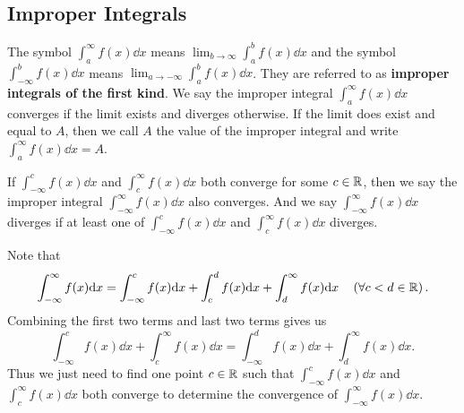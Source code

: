 \documentclass[a4paper]{ctexart}
\begin{document}
    \subsection{Improper Integrals}
    \begin{mydef}
        The symbol $\displaystyle \int_a^\infty f(x) \dd x$ means $\displaystyle \lim_{b\to \infty} \int_a^b f(x) \dd x$ and the symbol $\displaystyle \int_{-\infty}^b f(x) \dd x$ means $\displaystyle \lim_{a\to -\infty} \int_a^b f(x) \dd x$. They are referred to as \textbf{improper integrals of the first kind}. We say the improper integral $\displaystyle \int_a^\infty f(x) \dd x$ converges if the limit exists and diverges otherwise. If the limit does exist and equal to $A$, then we call $A$ the value of the improper integral and write $\displaystyle \int_a^\infty f(x) \dd x=A$.

        If $\displaystyle \int_{-\infty}^c f(x) \dd x$ and $\displaystyle \int_c^\infty f(x) \dd x$ both converge for some $c\in \mathbb{R}$, then we say the improper integral $\displaystyle \int_{-\infty}^\infty f(x) \dd x$ also converges. And we say $\displaystyle \int_{-\infty}^\infty f(x) \dd x$ diverges if at least one of $\displaystyle \int_{-\infty}^c f(x) \dd x$ and $\displaystyle \int_c^\infty f(x) \dd x$ diverges.
    \end{mydef}
    \begin{myrmk}
        Note that
        \[
        \int_{-\infty}^\infty f(x) \dd x = \int_{-\infty}^c f(x) \dd x + \int_c^d f(x) \dd x + \int_d^\infty f(x) \dd x \quad \left( \forall c<d\in \mathbb{R} \right).
        \]
        Combining the first two terms and last two terms gives us
        \[
        \int_{-\infty}^c f(x) \dd x + \int_c^\infty f(x) \dd x = \int_{-\infty}^d f(x) \dd x + \int_d^\infty f(x) \dd x.
        \]
        Thus we just need to find one point $c\in \mathbb{R}$ such that $\displaystyle \int_{-\infty}^c f(x) \dd x$ and $\displaystyle \int_c^\infty f(x) \dd x$ both converge to determine the convergence of $\displaystyle \int_{-\infty}^\infty f(x) \dd x$.
    \end{myrmk}
\end{document}
